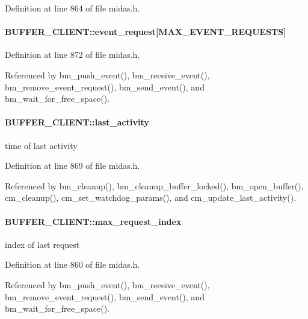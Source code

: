 Definition at line 864 of file midas.h.
\paragraph[{event\_\-request}]{ {\bf BUFFER\_\-CLIENT::event\_\-request}\mbox{[}MAX\_\-EVENT\_\-REQUESTS\mbox{]}}\hfill\label{structBUFFER__CLIENT_abc037ad8bce6896253754e3cbf8730b0}


Definition at line 872 of file midas.h.

Referenced by bm\_\-push\_\-event(), bm\_\-receive\_\-event(), bm\_\-remove\_\-event\_\-request(), bm\_\-send\_\-event(), and bm\_\-wait\_\-for\_\-free\_\-space().
\paragraph[{last\_\-activity}]{ {\bf BUFFER\_\-CLIENT::last\_\-activity}}\hfill\label{structBUFFER__CLIENT_a90d5bebe80eaf1d76dd2c97d54796efd}
time of last activity 

Definition at line 869 of file midas.h.

Referenced by bm\_\-cleanup(), bm\_\-cleanup\_\-buffer\_\-locked(), bm\_\-open\_\-buffer(), cm\_\-cleanup(), cm\_\-set\_\-watchdog\_\-params(), and cm\_\-update\_\-last\_\-activity().
\paragraph[{max\_\-request\_\-index}]{ {\bf BUFFER\_\-CLIENT::max\_\-request\_\-index}}\hfill\label{structBUFFER__CLIENT_ac7c61ec3f675c1a196751ec73baabb43}
index of last request 

Definition at line 860 of file midas.h.

Referenced by bm\_\-push\_\-event(), bm\_\-receive\_\-event(), bm\_\-remove\_\-event\_\-request(), bm\_\-send\_\-event(), and bm\_\-wait\_\-for\_\-free\_\-space().
